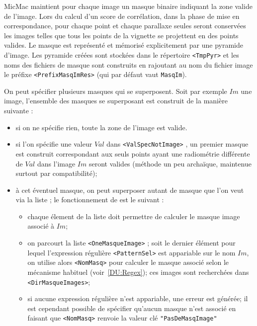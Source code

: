MicMac maintient pour chaque image
un masque binaire indiquant la zone valide de l'image.
Lors du calcul d'un score de corr\'elation, dans 
la phase de  mise en correspondance, pour chaque point et chaque parallaxe
seules seront conserv\'ees les images telles que tous les points
de la vignette se projettent en des points valides.
Le masque est repr\'esent\'e et m\'emoris\'e explicitement 
par une pyramide d'image.  Les pyramide cr\'e\'ees sont stock\'ees
dans le r\'epertoire {\tt <TmpPyr>} et les 
noms des fichiers de masque  sont construits
en rajoutant au nom du fichier image le pr\'efixe  {\tt <PrefixMasqImRes>}
(qui par d\'efaut vaut {\tt MasqIm}).

On peut sp\'ecifier plusieurs masques qui se superposent.
Soit par exemple $Im$ une image, l'ensemble des  
masques se superposant est construit de la mani\`ere suivante :

\begin{itemize}

   \item  si on ne sp\'ecifie rien, toute la zone de l'image est valide.

   \item  si l'on sp\'ecifie une valeur $Val$ dans {\tt <ValSpecNotImage>} ,
          un premier masque est construit correspondant aux 
          seuls points ayant une radiom\'etrie diff\'erente de $Val$ dans l'image
          $Im$ seront valides (m\'ethode un peu archa\"ique, maintenue surtout
          par compatibilit\'e);

    \item \`a cet \'eventuel masque, on peut superposer autant de masque que 
          l'on veut via la liste  {\tt  <MasqImageIn >}; le fonctionnement de
           {\tt  <MasqImageIn >} est le suivant :

    \begin{itemize}
          \item  chaque \'element de la liste  {\tt  <MasqImageIn >} doit permettre
                 de calculer  le masque image associ\'e \`a $Im$;

          \item  on parcourt la liste {\tt <OneMasqueImage>} ; soit 
                 le dernier \'el\'ement pour lequel l'expression r\'eguli\`ere 
                 {\tt <PatternSel>} est  appariable sur le nom $Im$, on
                 utilise alors {\tt <NomMasq>} pour calculer le masque
                 associ\'e selon le m\'ecanisme habituel (voir~\ref{DU:Regex});
                 ces images sont recherch\'ees dans {\tt   <DirMasqueImages>};

          \item  si aucune expression r\'eguli\`ere n'est appariable, une
                 erreur est g\'en\'er\'ee; il est cependant possible
                 de sp\'ecifier qu'aucun masque n'est associ\'e en faisant
                 que {\tt <NomMasq>} renvoie la valeur cl\'e {\tt "PasDeMasqImage"}

     \end{itemize}
\end{itemize}

